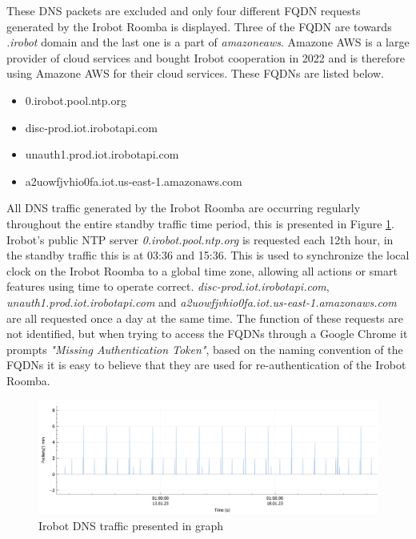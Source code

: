 These DNS packets are excluded and only four different FQDN requests generated by the Irobot Roomba is displayed. Three of the FQDN are towards \textit{.irobot} domain and the last one is a part of \textit{amazoneaws}. Amazone AWS is a large provider of cloud services and bought Irobot cooperation in 2022 \cite{irobot2023_amazone} and is therefore using Amazone AWS for their cloud services. These FQDNs are listed below. 

\begin{itemize}
    \item 0.irobot.pool.ntp.org
    \item disc-prod.iot.irobotapi.com
    \item unauth1.prod.iot.irobotapi.com
    \item a2uowfjvhio0fa.iot.us-east-1.amazonaws.com
\end{itemize}

All DNS traffic generated by the Irobot Roomba are occurring regularly throughout the entire standby traffic time period, this is presented in Figure \ref{fig:dns_irobot_graph}. Irobot's public NTP server \textit{0.irobot.pool.ntp.org} is requested each 12th hour,  in the standby traffic this is at 03:36 and 15:36. This is used to synchronize the local clock on the Irobot Roomba to a global time zone, allowing all actions or smart features using time to operate correct. \textit{disc-prod.iot.irobotapi.com}, \textit{unauth1.prod.iot.irobotapi.com} and \textit{a2uowfjvhio0fa.iot.us-east-1.amazonaws.com} are all requested once a day at the same time. The function of these requests are not identified, but when trying to access the FQDNs through a Google Chrome it prompts \textit{"Missing Authentication Token"}, based on the naming convention of the FQDNs it is easy to believe that they are used for re-authentication of the Irobot Roomba. 

\begin{figure}[H]
    \centering
    \includegraphics[width=\textwidth]{figures/DNS_irobot_graph.png}
    \caption{Irobot DNS traffic presented in graph}
    \label{fig:dns_irobot_graph}
\end{figure}

